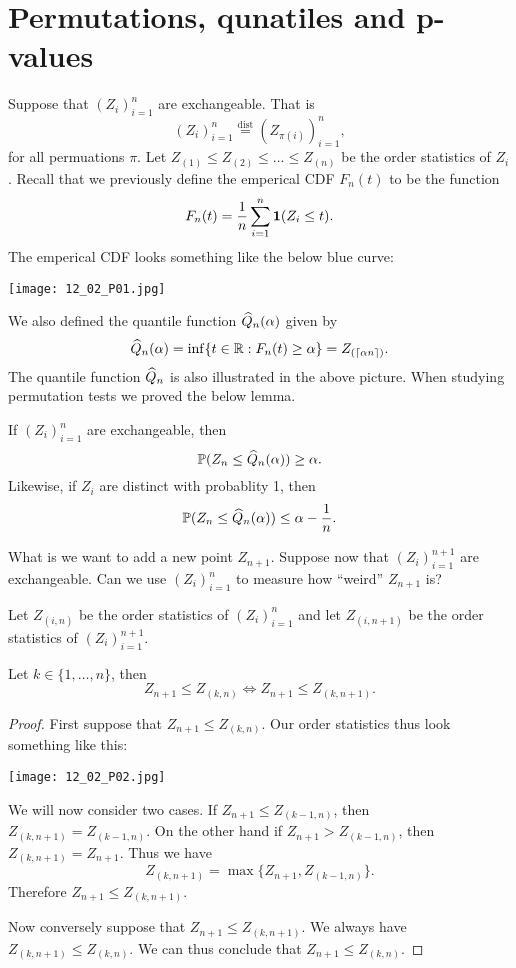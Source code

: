 \section{Permutations, qunatiles and p-values}
Suppose that $(Z_i)_{i=1}^n$ are exchangeable. That is 
\[(Z_i)_{i=1}^n \stackrel{\text{dist}}{=} (Z_{\pi(i)})_{i=1}^n, \]
for all permuations $\pi$. Let $Z_{(1)}\le Z_{(2)} \le\ldots\le Z_{(n)}$ be the order statistics of $Z_i$. Recall that we previously define the emperical CDF $F_n(t)$ to be the function 
\[F_n(t) = \frac{1}{n}\sum_{i=1}^n {{\bf 1}}(Z_i \le t). \]
The emperical CDF looks something like the below blue curve:
\begin{center}
    \texttt{[image: 12\_02\_P01.jpg]}
\end{center}
We also defined the quantile function $\widehat{Q}_n({\alpha})$ given by 
\[\widehat{Q}_n({\alpha}) = \inf\{t \in {\mathbb R} : F_n(t)\ge {\alpha}\} = Z_{(\lceil {\alpha} n \rceil)}. \]
The quantile function $\widehat{Q}_n$ is also illustrated in the above picture. When studying permutation tests we proved the below lemma.
\begin{lemma}
    If $(Z_i)_{i=1}^n$ are exchangeable, then 
    \[{\mathbb{P}}(Z_n \le \widehat{Q}_n({\alpha}))\ge {\alpha}. \]
    Likewise, if $Z_i$ are distinct with probablity 1, then 
    \[{\mathbb{P}}(Z_n \le \widehat{Q}_n({\alpha}))\le {\alpha}-\frac{1}{n}. \]
\end{lemma}
What is we want to add a new point $Z_{n+1}$. Suppose now that $(Z_i)_{i=1}^{n+1}$ are exchangeable. Can we use $(Z_i)_{i=1}^n$ to measure how ``weird'' $Z_{n+1}$ is?
\begin{notn}
    Let $Z_{(i,n)}$ be the order statistics of $(Z_i)_{i=1}^n$ and let $Z_{(i,n+1)}$ be the order statistics of $(Z_i)_{i=1}^{n+1}$.
\end{notn}
\begin{lemma}
    Let $k \in \{1,\ldots,n\}$, then 
    \[Z_{n+1} \le Z_{(k,n)} \Longleftrightarrow Z_{n+1} \le Z_{(k,n+1)}. \]
\end{lemma}
\begin{proof}
    First suppose that $Z_{n+1} \le Z_{(k,n)}$. Our order statistics thus look something like this:
    \begin{center}
        \texttt{[image: 12\_02\_P02.jpg]}
    \end{center}
    We will now consider two cases. If $Z_{n+1} \le Z_{(k-1,n)}$, then $Z_{(k,n+1)}=Z_{(k-1,n)}$. On the other hand if $Z_{n+1} > Z_{(k-1,n)}$, then $Z_{(k,n+1)}=Z_{n+1}$. Thus we have
    \[Z_{(k,n+1)} = \max\{Z_{n+1}, Z_{(k-1,n)}\}. \]
    Therefore $Z_{n+1} \le Z_{(k,n+1)}$.

    Now conversely suppose that $Z_{n+1} \le Z_{(k,n+1)}$. We always have $Z_{(k,n+1)} \le Z_{(k,n)}$. We can thus conclude that $Z_{n+1}\le Z_{(k,n)}$.
\end{proof}
